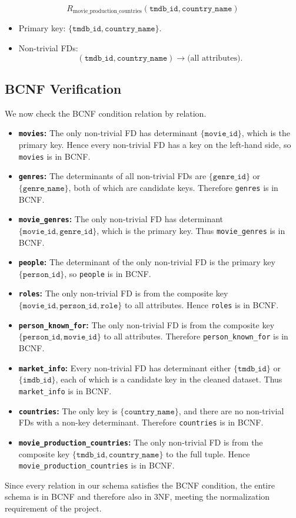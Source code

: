 \documentclass{article}
\begin{document}
\[
R_{\text{movie\_production\_countries}}( \texttt{tmdb\_id}, \texttt{country\_name} )
\]

\begin{itemize}
    \item Primary key: $\{\texttt{tmdb\_id}, \texttt{country\_name}\}$.
    \item Non-trivial FDs:
    \[
    (\texttt{tmdb\_id}, \texttt{country\_name}) \rightarrow \text{(all attributes)}.
    \]
\end{itemize}

\subsection*{BCNF Verification}

We now check the BCNF condition relation by relation.

\begin{itemize}
    \item \textbf{\texttt{movies}:} The only non-trivial FD has determinant $\{\texttt{movie\_id}\}$, which is the primary key. Hence every non-trivial FD has a key on the left-hand side, so \texttt{movies} is in BCNF.
    \item \textbf{\texttt{genres}:} The determinants of all non-trivial FDs are $\{\texttt{genre\_id}\}$ or $\{\texttt{genre\_name}\}$, both of which are candidate keys. Therefore \texttt{genres} is in BCNF.
    \item \textbf{\texttt{movie\_genres}:} The only non-trivial FD has determinant $\{\texttt{movie\_id}, \texttt{genre\_id}\}$, which is the primary key. Thus \texttt{movie\_genres} is in BCNF.
    \item \textbf{\texttt{people}:} The determinant of the only non-trivial FD is the primary key $\{\texttt{person\_id}\}$, so \texttt{people} is in BCNF.
    \item \textbf{\texttt{roles}:} The only non-trivial FD is from the composite key $\{\texttt{movie\_id}, \texttt{person\_id}, \texttt{role}\}$ to all attributes. Hence \texttt{roles} is in BCNF.
    \item \textbf{\texttt{person\_known\_for}:} The only non-trivial FD is from the composite key $\{\texttt{person\_id}, \texttt{movie\_id}\}$ to all attributes. Therefore \texttt{person\_known\_for} is in BCNF.
    \item \textbf{\texttt{market\_info}:} Every non-trivial FD has determinant either $\{\texttt{tmdb\_id}\}$ or $\{\texttt{imdb\_id}\}$, each of which is a candidate key in the cleaned dataset. Thus \texttt{market\_info} is in BCNF.
    \item \textbf{\texttt{countries}:} The only key is $\{\texttt{country\_name}\}$, and there are no non-trivial FDs with a non-key determinant. Therefore \texttt{countries} is in BCNF.
    \item \textbf{\texttt{movie\_production\_countries}:} The only non-trivial FD is from the composite key $\{\texttt{tmdb\_id}, \texttt{country\_name}\}$ to the full tuple. Hence \texttt{movie\_production\_countries} is in BCNF.
\end{itemize}

Since every relation in our schema satisfies the BCNF condition, the entire schema is in BCNF and therefore also in 3NF, meeting the normalization requirement of the project.
\end{document}
